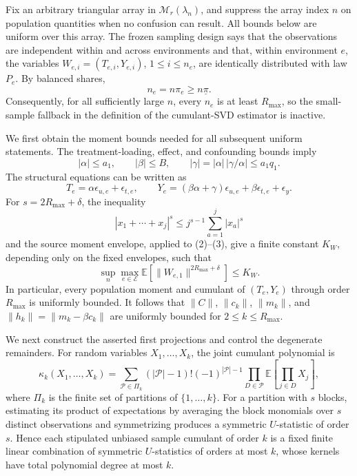 Fix an arbitrary triangular array in \(\mathcal M_r(\lambda_n)\), and suppress the array index \(n\) on population quantities when no confusion can result.  All bounds below are uniform over this array.  The frozen sampling design says that the observations are independent within and across environments and that, within environment \(e\), the variables \(W_{e,i}=(T_{e,i},Y_{e,i})\), \(1\leq i\leq n_e\), are identically distributed with law \(P_e\).  By balanced shares,
\[
 n_e=n\pi_e\geq n\underline\pi . \tag{1}
\]
Consequently, for all sufficiently large \(n\), every \(n_e\) is at least \(R_{\max}\), so the small-sample fallback in the definition of the cumulant-SVD estimator is inactive.

We first obtain the moment bounds needed for all subsequent uniform statements.  The treatment-loading, effect, and confounding bounds imply
\[
 |\alpha|\leq a_1,\qquad |\beta|\leq B,
 \qquad |\gamma|=|\alpha|\,|\gamma/\alpha|\leq a_1q_1. \tag{2}
\]
The structural equations can be written as
\[
 T_e=\alpha\epsilon_{u,e}+\epsilon_{t,e},
 \qquad
 Y_e=(\beta\alpha+\gamma)\epsilon_{u,e}
       +\beta\epsilon_{t,e}+\epsilon_y. \tag{3}
\]
For \(s=2R_{\max}+\delta\), the inequality
\[
 |x_1+\cdots+x_j|^s\leq j^{s-1}\sum_{a=1}^j|x_a|^s \tag{4}
\]
and the source moment envelope, applied to (2)--(3), give a finite constant \(K_W\), depending only on the fixed envelopes, such that
\[
 \sup_n\max_{e\in\mathcal E}
 \mathbb E\!\left[\|W_{e,1}\|^{2R_{\max}+\delta}\right]
 \leq K_W. \tag{5}
\]
In particular, every population moment and cumulant of \((T_e,Y_e)\) through order \(R_{\max}\) is uniformly bounded.  It follows that \(\|C\|\), \(\|c_k\|\), \(\|m_k\|\), and
\(\|h_k\|=\|m_k-\beta c_k\|\) are uniformly bounded for \(2\leq k\leq R_{\max}\).

We next construct the asserted first projections and control the degenerate remainders.  For random variables \(X_1,\ldots,X_k\), the joint cumulant polynomial is
\[
 \kappa_k(X_1,\ldots,X_k)
 =\sum_{\mathcal P\in\Pi_k}
 (|\mathcal P|-1)!(-1)^{|\mathcal P|-1}
 \prod_{D\in\mathcal P}
 \mathbb E\!\left[\prod_{j\in D}X_j\right], \tag{6}
\]
where \(\Pi_k\) is the finite set of partitions of \(\{1,\ldots,k\}\).  For a partition with \(s\) blocks, estimating its product of expectations by averaging the block monomials over \(s\) distinct observations and symmetrizing produces a symmetric \(U\)-statistic of order \(s\).  Hence each stipulated unbiased sample cumulant of order \(k\) is a fixed finite linear combination of symmetric \(U\)-statistics of orders at most \(k\), whose kernels have total polynomial degree at most \(k\).


